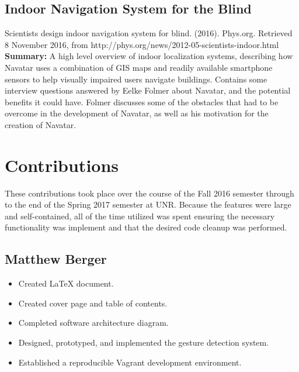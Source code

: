 \documentclass{scrreprt}
\begin{document}
\section{Indoor Navigation System for the Blind}
Scientists design indoor navigation system for blind. (2016). Phys.org. Retrieved 8 November 2016, from http://phys.org/news/2012-05-scientists-indoor.html\\

\textbf{Summary:}
 A high level overview of indoor localization systems, describing how Navatar uses a combination of GIS maps and readily available smartphone sensors to help visually impaired users navigate buildings. Contains some interview questions answered by Eelke Folmer about Navatar, and the potential benefits it could have. Folmer discusses some of the obstacles that had to be overcome in the development of Navatar, as well as his motivation for the creation of Navatar.


\chapter{Contributions}
\begin{highlightbox}These contributions took place over the course of the Fall 2016 semester through to the end of the Spring 2017 semester at UNR. Because the features were large and self-contained, all of the time utilized was spent ensuring the necessary functionality was implement and that the desired code cleanup was performed.\end{highlightbox}
	\section{Matthew Berger}
		\begin{itemize}
			\item Created LaTeX document.
			\item Created cover page and table of contents.
			\item Completed software architecture diagram.
			\item \begin{highlightbox} Designed, prototyped, and implemented the gesture detection system.
			\end{highlightbox}
			\item \begin{highlightbox} Established a reproducible Vagrant development environment.
			\end{highlightbox}
		\end{itemize}
\end{document}
